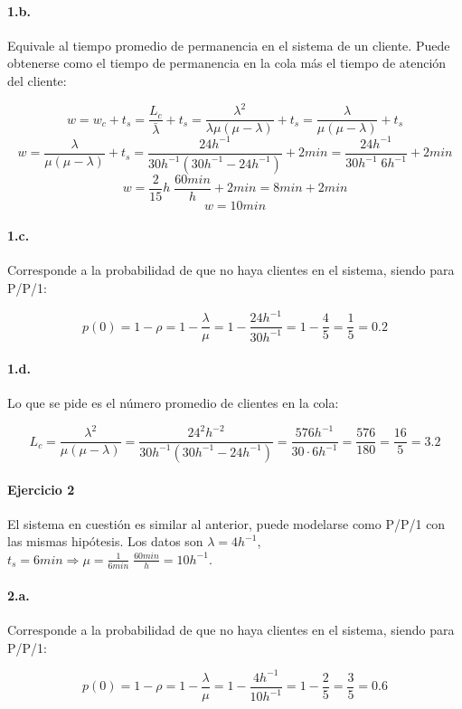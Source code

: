 \documentclass{article}
\begin{document}
    \paragraph{1.b.} Equivale al tiempo promedio de permanencia en el sistema de un cliente. Puede obtenerse como el tiempo de permanencia en la cola más el tiempo de atención del cliente:
    
    $$ w = w_c + t_s = \frac{L_c}{\bar\lambda} + t_s = \frac{\lambda^2}{\lambda\mu(\mu-\lambda)} + t_s = \frac{\lambda}{\mu(\mu-\lambda)} + t_s $$
    $$ w = \frac{\lambda}{\mu(\mu-\lambda)} + t_s = \frac{24 h^{-1}}{30 h^{-1}(30 h^{-1} - 24 h^{-1})} + 2 min = \frac{24 h^{-1}}{30 h^{-1} \; 6 h^{-1}} + 2 min $$
    $$ w = \frac{2}{15} h \; \frac{60min}{h} + 2 min = 8 min + 2 min $$
    $$ w = 10 min $$

    \paragraph{1.c.} Corresponde a la probabilidad de que no haya clientes en el sistema, siendo para P/P/1:
    
    $$ p(0) = 1 - \rho = 1 - \frac{\lambda}{\mu} = 1 - \frac{24h^{-1}}{30h^{-1}} = 1 - \frac{4}{5} = \frac{1}{5} = 0.2 $$
    
    \paragraph{1.d.} Lo que se pide es el número promedio de clientes en la cola:
    
    $$ L_c = \frac{\lambda^2}{\mu(\mu - \lambda)} = \frac{24^2h^{-2}}{30h^{-1}(30h^{-1}-24h^{-1})} = \frac{576h^{-1}}{30 \cdot 6h^{-1}} = \frac{576}{180} = \frac{16}{5} = 3.2 $$

\paragraph{Ejercicio 2}
    El sistema en cuestión es similar al anterior, puede modelarse como P/P/1 con las mismas hipótesis. Los datos son $ \lambda = 4h^{-1} $, $ t_s = 6min \Rightarrow \mu = \frac{1}{6min} \; \frac{60min}{h} = 10h^{-1} $.
    
    \paragraph{2.a.} Corresponde a la probabilidad de que no haya clientes en el sistema, siendo para P/P/1:
    
    $$ p(0) = 1 - \rho = 1 - \frac{\lambda}{\mu} = 1 - \frac{4h^{-1}}{10h^{-1}} = 1 - \frac{2}{5} = \frac{3}{5} = 0.6 $$
    
\end{document}
